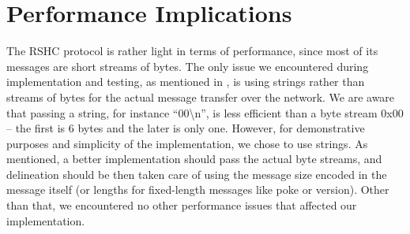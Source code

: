 \section{Performance Implications}
\label{sec:perf}

The RSHC protocol is rather light in terms of performance, since most of its messages are short streams of bytes. The only issue we encountered during implementation and testing, as mentioned in , is using strings rather than streams of bytes for the actual message transfer over the network. We are aware that passing a string, for instance ``00\textbackslash n'', is less efficient than a byte stream 0x00 -- the first is 6 bytes and the later is only one. However, for demonstrative purposes and simplicity of the implementation, we chose to use strings. As mentioned, a better implementation should pass the actual byte streams, and delineation should be then taken care of using the message size encoded in the message itself (or lengths for fixed-length messages like poke or version). Other than that, we encountered no other performance issues that affected our implementation.